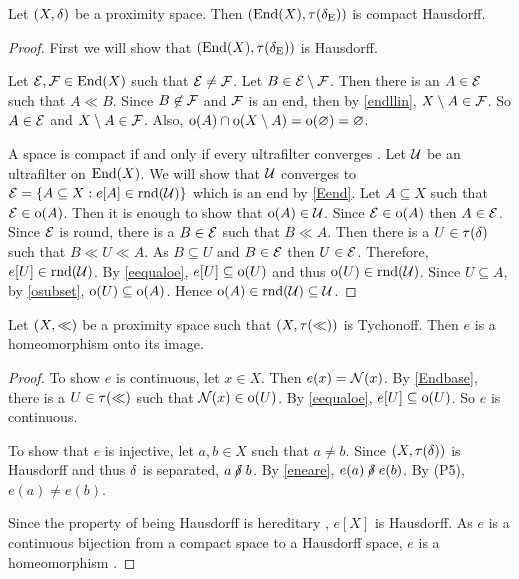 \begin{theorem}
	\label{endcptt}
	Let \( (X,\mathord{\delta}) \) be a proximity space.  Then \( (\operatorname{End}(X),\tau(\mathrel{\delta_\text{E}})) \) is compact Hausdorff.
\end{theorem}
\begin{proof}
	First we will show that \( (\operatorname{End}(X),\tau(\mathrel{\delta_\text{E}})) \) is Hausdorff.
	
	Let \( \mathcal{E},\mathcal{F} \in \operatorname{End}(X) \) such that \( \mathcal{E} \neq \mathcal{F} \).  Let \( B \in \mathcal{E} \setminus \mathcal{F} \).  Then there is an \( A \in \mathcal{E} \) such that \( A \ll B \).  Since \( B \not\in \mathcal{F} \) and \( \mathcal{F} \) is an end, then by \ref{endllin}, \( X \setminus A \in \mathcal{F} \).  So \( A \in \mathcal{E} \) and \( X \setminus A \in \mathcal{F} \).  Also, \( \operatorname{o}(A) \cap \operatorname{o}(X \setminus A) = \operatorname{o}(\varnothing) = \varnothing \).
	
	A space is compact if and only if every ultrafilter converges \cite{joshi}.  Let \( \mathcal{U} \) be an ultrafilter on \( \operatorname{End}(X) \).  We will show that \( \mathcal{U} \) converges to \( \mathcal{E} = \{ A \subseteq X : e[A] \in \operatorname{rnd}(\mathcal{U}) \} \) which is an end by \ref{Eend}.  Let \( A \subseteq X \) such that \( \mathcal{E} \in \operatorname{o}(A) \).  Then it is enough to show that \( \operatorname{o}(A) \in \mathcal{U} \).  Since \( \mathcal{E} \in \operatorname{o}(A) \) then \( A \in \mathcal{E} \).  Since \( \mathcal{E} \) is round, there is a \( B \in \mathcal{E} \) such that \( B \ll A \).  Then there is a \( U \in \tau(\mathord{\delta}) \) such that \( B \ll U \ll A \).  As \( B \subseteq U \) and \( B \in \mathcal{E} \) then \( U \in \mathcal{E} \).  Therefore, \( e[U] \in \operatorname{rnd}(\mathcal{U}) \).  By \ref{eequaloe}, \( e[U] \subseteq \operatorname{o}(U) \) and thus \( \operatorname{o}(U) \in \operatorname{rnd}(\mathcal{U}) \).  Since \( U \subseteq A \), by \ref{osubset}, \( \operatorname{o}(U) \subseteq \operatorname{o}(A) \).  Hence \( \operatorname{o}(A) \in \operatorname{rnd}(\mathcal{U}) \subseteq \mathcal{U} \).
\end{proof}

\begin{lemma}
	\label{ehomeo}
	Let \( (X,\mathord{\ll}) \) be a proximity space such that \( (X,\tau(\mathord{\ll})) \) is Tychonoff.  Then \( e \) is a homeomorphism onto its image.
\end{lemma}
\begin{proof}
	To show \( e \) is continuous, let \( x \in X \).  Then \( e(x) = \mathcal{N}(x) \).  By \ref{Endbase}, there is a \( U \in \tau(\mathord{\ll}) \) such that \( \mathcal{N}(x) \in \operatorname{o}(U) \).  By \ref{eequaloe}, \( e[U] \subseteq \operatorname{o}(U) \).  So \( e \) is continuous.
	
	To show that \( e \) is injective, let \( a,b \in X \) such that \( a \neq b \).  Since \( (X,\tau(\mathord{\delta})) \) is Hausdorff and thus \( \mathord{\delta} \) is separated, \( a \nnear b \).  By \ref{eneare}, \( e(a) \nnear e(b) \).  By (P5), \( e(a) \neq e(b) \).
	
	Since the property of being Hausdorff is hereditary \cite[p.67]{patty}, \( e[X] \) is Hausdorff.  As \( e \) is a continuous bijection from a compact space to a Hausdorff space, \( e \) is a homeomorphism \cite[p.316]{givant}.
\end{proof}

